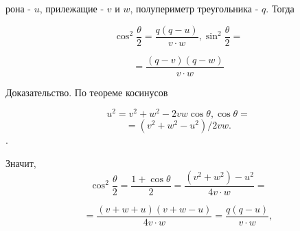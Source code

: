 \documentclass[twocolumn]{article}
\begin{document}
\begin{minipage}[t]{\columnwidth}
рона - $u$, прилежащие - $v$ и $w$, полупериметр треугольника - $q$. Тогда

$$\cos^{2}\frac{\theta}{2}=\frac{q(q-u)}{v \cdot w}, \sin^{2}\frac{\theta}{2}=$$

$$=\frac{(q-v)(q-w)}{v \cdot w}$$

Доказательство. По теореме косинусов

$$u^2 = v^2 + w^2 - 2vw \cos \theta,\cos \theta =$$
$$=(v^2+w^2-u^2)/2vw.$$.

Значит,
$$\cos^{2}\frac{\theta}{2} =\frac{1+\cos\theta}{2}=\frac{(v^2+w^2)-u^2}{4v \cdot w} =$$

$$=\frac{(v+w+u)(v+w-u)}{4v \cdot w} = \frac{q(q-u)}{v \cdot w},$$
\end{minipage}
\end{document}
